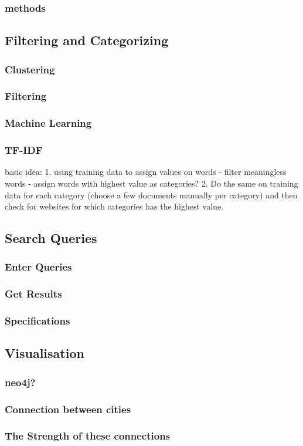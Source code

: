 \subsubsection{methods}

\subsection{Filtering and Categorizing}

\subsubsection{Clustering}
\subsubsection{Filtering}
\subsubsection{Machine Learning}
\subsubsection{TF-IDF}
basic idea: 1. using training data to assign values on words - filter meaningless words - assign words with highest value as categories? 2. Do the same on training data for each category (choose a few documents manually per category) and then check for websites for which categories has the highest value.

\subsection{Search Queries}

\subsubsection{Enter Queries}
\subsubsection{Get Results}
\subsubsection{Specifications}

\subsection{Visualisation}
\subsubsection{neo4j?}

\subsubsection{Connection between cities}
\subsubsection{The Strength of these connections}